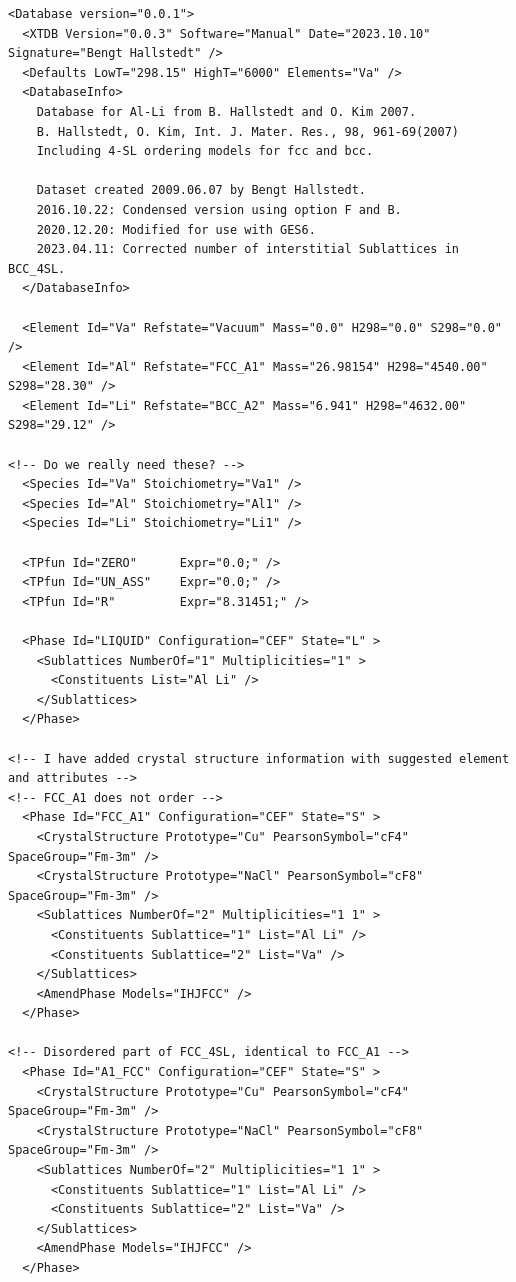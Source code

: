 \documentclass{article}
\begin{document}
\begin{appendices}
\begin{verbatim}
<Database version="0.0.1">
  <XTDB Version="0.0.3" Software="Manual" Date="2023.10.10" Signature="Bengt Hallstedt" />
  <Defaults LowT="298.15" HighT="6000" Elements="Va" />
  <DatabaseInfo>
    Database for Al-Li from B. Hallstedt and O. Kim 2007.
	B. Hallstedt, O. Kim, Int. J. Mater. Res., 98, 961-69(2007)
	Including 4-SL ordering models for fcc and bcc.
	
    Dataset created 2009.06.07 by Bengt Hallstedt.
    2016.10.22: Condensed version using option F and B.
    2020.12.20: Modified for use with GES6.
    2023.04.11: Corrected number of interstitial Sublattices in BCC_4SL.
  </DatabaseInfo>

  <Element Id="Va" Refstate="Vacuum" Mass="0.0" H298="0.0" S298="0.0" />
  <Element Id="Al" Refstate="FCC_A1" Mass="26.98154" H298="4540.00" S298="28.30" />
  <Element Id="Li" Refstate="BCC_A2" Mass="6.941" H298="4632.00" S298="29.12" />

<!-- Do we really need these? -->
  <Species Id="Va" Stoichiometry="Va1" />
  <Species Id="Al" Stoichiometry="Al1" />
  <Species Id="Li" Stoichiometry="Li1" />

  <TPfun Id="ZERO"      Expr="0.0;" />
  <TPfun Id="UN_ASS"    Expr="0.0;" />
  <TPfun Id="R"         Expr="8.31451;" />

  <Phase Id="LIQUID" Configuration="CEF" State="L" >
    <Sublattices NumberOf="1" Multiplicities="1" >
      <Constituents List="Al Li" />
    </Sublattices>
  </Phase>

<!-- I have added crystal structure information with suggested element and attributes -->
<!-- FCC_A1 does not order -->
  <Phase Id="FCC_A1" Configuration="CEF" State="S" >
	<CrystalStructure Prototype="Cu" PearsonSymbol="cF4" SpaceGroup="Fm-3m" />
	<CrystalStructure Prototype="NaCl" PearsonSymbol="cF8" SpaceGroup="Fm-3m" />
    <Sublattices NumberOf="2" Multiplicities="1 1" >
      <Constituents Sublattice="1" List="Al Li" />
      <Constituents Sublattice="2" List="Va" />
    </Sublattices>
    <AmendPhase Models="IHJFCC" />
  </Phase>

<!-- Disordered part of FCC_4SL, identical to FCC_A1 -->
  <Phase Id="A1_FCC" Configuration="CEF" State="S" >
	<CrystalStructure Prototype="Cu" PearsonSymbol="cF4" SpaceGroup="Fm-3m" />
	<CrystalStructure Prototype="NaCl" PearsonSymbol="cF8" SpaceGroup="Fm-3m" />
    <Sublattices NumberOf="2" Multiplicities="1 1" >
      <Constituents Sublattice="1" List="Al Li" />
      <Constituents Sublattice="2" List="Va" />
    </Sublattices>
    <AmendPhase Models="IHJFCC" />
  </Phase>


\end{verbatim}
\end{appendices}
\end{document}
